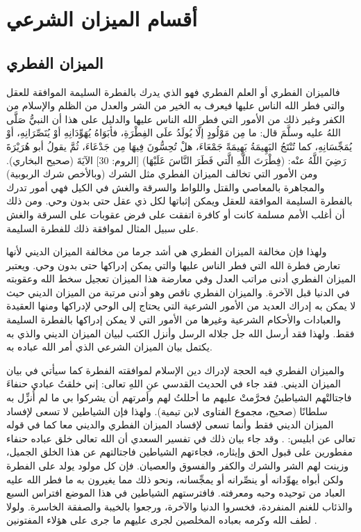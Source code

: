 \section{أقسام الميزان الشرعي}

\subsection{الميزان الفطري}

فالميزان الفطري أو العلم الفطري فهو الذي يدرك بالفطرة السليمة الموافقة للعقل والتي فطر الله الناس عليها فيعرف به الخير من الشر والعدل من الظلم والإسلام من الكفر وغير ذلك من الأمور التي فطر الله الناس عليها والدليل على هذا أن النبيُّ صَلَّى اللهُ عليه وسلَّمَ قال: ما مِن مَوْلُودٍ إلَّا يُولَدُ علَى الفِطْرَةِ، فأبَوَاهُ يُهَوِّدَانِهِ أوْ يُنَصِّرَانِهِ، أوْ يُمَجِّسَانِهِ، كما تُنْتَجُ البَهِيمَةُ بَهِيمَةً جَمْعَاءَ، هلْ تُحِسُّونَ فِيهَا مِن جَدْعَاءَ، ثُمَّ يقولُ أبو هُرَيْرَةَ رَضِيَ اللَّهُ عنْه: (فِطْرَتَ اللَّهِ الَّتي فَطَرَ النَّاسَ عَلَيْهَا) [الروم: 30] الآيَةَ {\footnotesize (صحيح البخاري)}. ومن الأمور التي تخالف الميزان الفطري مثل الشرك (وبالأخص شرك الربوبية) والمجاهرة بالمعاصي والقتل واللواط والسرقة والغش في الكيل فهي أمور تدرك بالفطرة السليمة الموافقة للعقل ويمكن إثباتها لكل ذي عقل حتى بدون وحي. 
ومن ذلك أن أغلب الأمم مسلمة كانت أو كافرة اتفقت على فرض عقوبات على السرقة والغش على سبيل المثال لموافقة ذلك للفطرة السليمة. 

ولهذا فإن مخالفة الميزان الفطري هي أشد جرما من مخالفة الميزان الديني لأنها تعارض فطرة الله التي فطر الناس عليها والتي يمكن إدراكها حتى بدون وحي. ويعتبر الميزان الفطري أدنى مراتب العدل وفي معارضة هذا الميزان تعجيل سخط الله وعقوبته في الدنيا قبل الآخرة. والميزان الفطري ناقص وهو أدنى مرتبة من الميزان الديني حيث لا يمكن به إدراك العديد من الأمور الشرعية التي يحتاج إلى الوحي لإدراكها ومنها العقيدة والعبادات والأحكام الشرعية وغيرها من الأمور التي لا يمكن إدراكها بالفطرة السليمة فقط. ولهذا فقد أرسل الله جل جلاله الرسل وأنزل الكتب لبيان الميزان الديني والذي به يكتمل بيان الميزان الشرعي الذي أمر الله عباده به.

والميزان الفطري فيه الحجة لإدراك دين الإسلام لموافقته الفطرة كما سيأتي في بيان الميزان الديني. فقد جاء في الحديث القدسي عنِ اللهِ تعالى: إني خلقتُ عبادي حنفاءَ فاجتالتْهم الشياطينُ فحرَّمتْ عليهم ما أحللتُ لهم وأمرتهم أن يشركوا بي ما لم أُنزِّل به سلطانًا {\footnotesize (صحيح، مجموع الفتاوى لابن تيمية)}.
ولهذا فإن الشياطين لا تسعى لإفساد الميزان الديني فقط وأنما تسعى لإفساد الميزان الفطري والديني معا كما في قوله تعالى عن ابليس: 
\quranayah*[4][119]{\footnotesize \surahname*[4]}. وقد جاء بيان ذلك في تفسير السعدي أن الله تعالى خلق عباده حنفاء مفطورين على قبول الحق وإيثاره، فجاءتهم الشياطين فاجتالتهم عن هذا الخلق الجميل، وزينت لهم الشر والشرك والكفر والفسوق والعصيان. فإن كل مولود يولد على الفطرة ولكن أبواه يهوِّدانه أو ينصِّرانه أو يمجِّسانه، ونحو ذلك مما يغيرون به ما فطر الله عليه العباد من توحيده وحبه ومعرفته. فافترستهم الشياطين في هذا الموضع افتراس السبع والذئاب للغنم المنفردة، فخسروا الدنيا والآخرة، ورجعوا بالخيبة والصفقة الخاسرة. ولولا لطف الله وكرمه بعباده المخلصين لجرى عليهم ما جرى على هؤلاء المفتونين \cite{tafsir_Saadi}.

